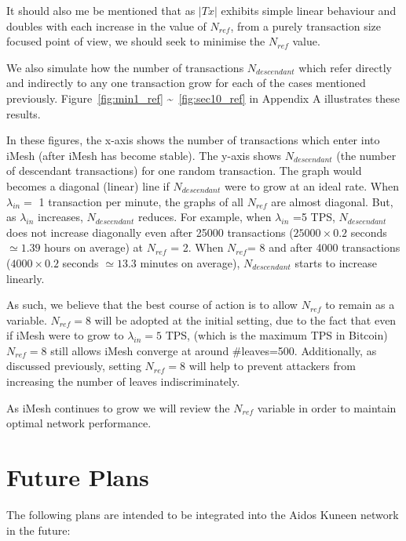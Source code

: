 \documentclass[a4paper,10pt,twocolumn]{article}
\begin{document}
	It should also me be mentioned that as \(|Tx|\) exhibits simple linear behaviour and doubles with each increase in the value of \( N_{ref} \), from a purely transaction size focused point of view, we should seek 
	to minimise the \( N_{ref} \) value.
	
	We also simulate how the number of transactions \( N_{descendant} \) which refer directly and indirectly to any one transaction grow 
	 for each of the cases mentioned previously. Figure~\ref{fig:min1_ref} \textasciitilde~\ref{fig:sec10_ref} in Appendix A illustrates these results.
	 
	 In these figures, the x-axis shows the number of transactions which enter into iMesh (after iMesh has become stable). The y-axis shows \( N_{descendant} \) 
	 (the number of descendant transactions) for one random transaction. The graph would becomes a diagonal (linear) line if \( N_{descendant} \) were to grow at an ideal rate.
	 When \( \lambda_{in}=\) 1 transaction per minute, the graphs of all \( N_{ref}\) are almost diagonal.
	 But, as \( \lambda_{in}\) increases,  \( N_{descendant} \) reduces.
	 For example, when \( \lambda_{in}\) =5 TPS, \( N_{descendant} \) 
	 does not increase diagonally even after  25000 transactions (\( 25000 \times 0.2\) seconds \(\simeq 1.39 \) hours on average) at \( N_{ref} \) = 2.
When \( N_{ref}\)= 8 and after 4000 transactions (\( 4000 \times 0.2\) seconds \(\simeq 13.3 \) minutes on average),
 \( N_{descendant}\) starts to increase linearly.

	 As such, we believe that the best course of action is to allow \( N_{ref}\) to remain as a variable. \( N_{ref}=8\) will be adopted at the initial setting, due to the fact that 
	 even if iMesh were to grow to \( \lambda_{in}=5\) TPS, (which is the maximum TPS
	 in Bitcoin) \( N_{ref}=8\) still allows iMesh converge at around \#leaves=500. 
	 Additionally, as discussed previously, setting \( N_{ref}=8\) will
	 help to prevent attackers from increasing the number of leaves indiscriminately.
	
 	 As iMesh continues to grow we will review the \( N_{ref}\) variable in order to maintain optimal network performance.
 	 
\section{Future Plans}
\label{sec:future plans}

	The following plans are intended to be integrated into the Aidos Kuneen network in the future:
	 
\end{document}
